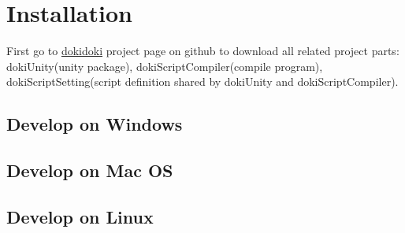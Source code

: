 \chapter{Installation}

First go to \href{https://github.com/kesumu/dokidoki}{dokidoki} project page on github to download all related project parts: dokiUnity(unity package), dokiScriptCompiler(compile program), dokiScriptSetting(script definition shared by dokiUnity and dokiScriptCompiler).

\section{Develop on Windows}
\section{Develop on Mac OS}
\section{Develop on Linux}